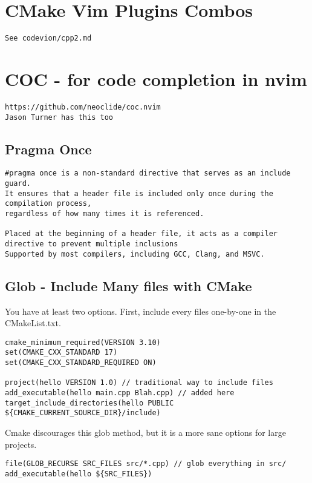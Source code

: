 \section{CMake Vim Plugins Combos}

\begin{verbatim}
See codevion/cpp2.md
\end{verbatim}

\section{COC - for code completion in nvim}
\begin{verbatim}
https://github.com/neoclide/coc.nvim
Jason Turner has this too
\end{verbatim}

\subsection{Pragma Once}

\begin{verbatim}
#pragma once is a non-standard directive that serves as an include guard. 
It ensures that a header file is included only once during the compilation process,
regardless of how many times it is referenced.

Placed at the beginning of a header file, it acts as a compiler directive to prevent multiple inclusions
Supported by most compilers, including GCC, Clang, and MSVC.
\end{verbatim}

\subsection{Glob - Include Many files with CMake}
 
You have at least two options. First, include every files one-by-one in the CMakeList.txt.
\begin{verbatim}
cmake_minimum_required(VERSION 3.10)
set(CMAKE_CXX_STANDARD 17)
set(CMAKE_CXX_STANDARD_REQUIRED ON)

project(hello VERSION 1.0) // traditional way to include files
add_executable(hello main.cpp Blah.cpp) // added here
target_include_directories(hello PUBLIC ${CMAKE_CURRENT_SOURCE_DIR}/include)
\end{verbatim}

Cmake discourages this glob method, but it is a more sane options for large projects.

\begin{verbatim}
file(GLOB_RECURSE SRC_FILES src/*.cpp) // glob everything in src/
add_executable(hello ${SRC_FILES})
\end{verbatim}

